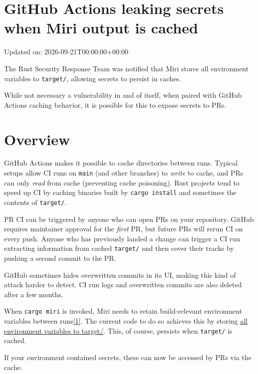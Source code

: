 \documentclass[11pt,a4paper]{article}
\begin{document}
\section{GitHub Actions leaking secrets when Miri output is cached}

Updated on: 2026-09-21T00:00:00+00:00

The Rust Security Response Team was notified that Miri stores all environment variables to \texttt{target/}, allowing secrets to persist in caches.

While not necessary a vulnerability in and of itself, when paired with GitHub Actions caching behavior, it is possible for this to expose secrets to PRs.

\section{Overview}

GitHub Actions makes it possible to cache directories between runs. Typical setups allow CI runs on \texttt{main} (and other branches) to \textit{write} to cache, and PRs can only \textit{read} from cache (preventing cache poisoning). Rust projects tend to speed up CI by caching binaries built by \texttt{cargo install} and sometimes the contents of \texttt{target/}.

PR CI can be triggered by anyone who can open PRs on your repository. GitHub requires maintainer approval for the \textit{first} PR, but future PRs will rerun CI on every push. Anyone who has previously landed a change can trigger a CI run extracting information from cached \texttt{target/} and then cover their tracks by pushing a second commit to the PR.

GitHub sometimes hides overwritten commits in its UI, making this kind of attack harder to detect. CI run logs and overwritten commits are also deleted after a few months.

When \texttt{cargo miri} is invoked, Miri needs to retain build-relevant environment variables between runs\href{https://blog.rust-lang.org/2026/09/21/github-actions-leaking-secrets-when-miri-output-is-cached/\#fn-1}{[1]}. The current code to do so achieves this by storing \href{https://github.com/rust-lang/miri/blob/165a9c3c96f0f4e6232278e62cb64648215bbc37/cargo-miri/src/util.rs\#L40-L42}{all environment variables to target/}. This, of course, persists when \texttt{target/} is cached.

If your environment contained secrets, these can now be accessed by PRs via the cache.
\end{document}
